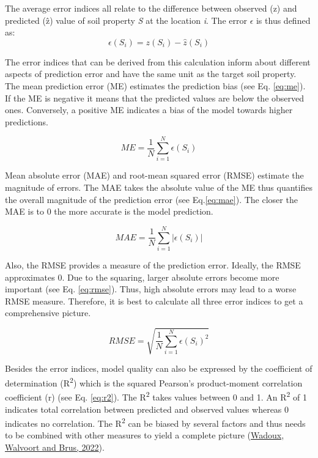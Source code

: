 \documentclass[
  10pt,
  b5paper,
  oneside]{book}
\begin{document}
The average error indices all relate to the difference between observed (z) and predicted (ẑ) value of soil property \emph{S} at the location \emph{i}. The error \(\epsilon\) is thus defined as:
\begin{equation}
\epsilon(S_{i}) = z(S_{i}) - \hat{z}(S_{i})
\end{equation}

The error indices that can be derived from this calculation inform about different aspects of prediction error and have the same unit as the target soil property. The mean prediction error (ME) estimates the prediction bias (see Eq. \eqref{eq:me}). If the ME is negative it means that the predicted values are below the observed ones. Conversely, a positive ME indicates a bias of the model towards higher predictions.

\begin{equation} 
  ME = \frac{1}{N}\sum_{i=1}^{N}\epsilon(S_{i})
  \label{eq:me}
\end{equation}

Mean absolute error (MAE) and root-mean squared error (RMSE) estimate the magnitude of errors. The MAE takes the absolute value of the ME thus quantifies the overall magnitude of the prediction error (see Eq.\eqref{eq:mae}). The closer the MAE is to 0 the more accurate is the model prediction.

\begin{equation} 
  MAE = \frac{1}{N}\sum_{i=1}^{N}|\epsilon(S_{i})|
  \label{eq:mae}
\end{equation}

Also, the RMSE provides a measure of the prediction error. Ideally, the RMSE approximates 0. Due to the squaring, larger absolute errors become more important (see Eq. \eqref{eq:rmse}). Thus, high absolute errors may lead to a worse RMSE measure. Therefore, it is best to calculate all three error indices to get a comprehensive picture.

\begin{equation} 
  RMSE = \sqrt{\frac{1}{N}\sum_{i=1}^{N}\epsilon(S_{i})^{2}}
  \label{eq:rmse}
\end{equation}

Besides the error indices, model quality can also be expressed by the coefficient of determination (R\textsuperscript{2}) which is the squared Pearson's product-moment correlation coefficient (r) (see Eq. \eqref{eq:r2}). The R\textsuperscript{2} takes values between 0 and 1. An R\textsuperscript{2} of 1 indicates total correlation between predicted and observed values whereas 0 indicates no correlation. The R\textsuperscript{2} can be biased by several factors and thus needs to be combined with other measures to yield a complete picture (\protect\hyperlink{ref-Wadoux2022}{Wadoux, Walvoort and Brus, 2022}).
\end{document}
